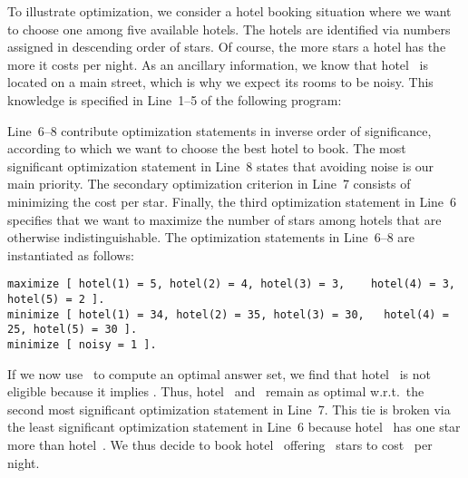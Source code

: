 \begin{example}\label{ex:opt}
To illustrate optimization, we consider a hotel booking situation
where we want to choose one among five available hotels.
The hotels are identified via numbers assigned in descending order of stars.
Of course, the more stars a hotel has the more it costs per night.
As an ancillary information, we know that hotel~ is located
on a main street, which is why we expect its rooms to be noisy.
This knowledge is specified in Line~1--5 of the following program:
%

%
Line~6--8 contribute optimization statements in inverse order of significance,
according to which we want to choose the best hotel to book.
The most significant optimization statement in Line~8 states that
avoiding noise is our main priority.
The secondary optimization criterion in Line~7 consists of
minimizing the cost per star.
Finally, the third optimization statement in Line~6 specifies that we want
to maximize the number of stars among hotels that are otherwise indistinguishable.
The optimization statements in Line~6--8 are instantiated as follows:%
%
\begin{lstlisting}[firstnumber=6,breaklines,breakindent=48pt]
maximize [ hotel(1) = 5, hotel(2) = 4, hotel(3) = 3,    hotel(4) = 3, hotel(5) = 2 ].
minimize [ hotel(1) = 34, hotel(2) = 35, hotel(3) = 30,   hotel(4) = 25, hotel(5) = 30 ].
minimize [ noisy = 1 ].
\end{lstlisting}
If we now use \clasp\ to compute an optimal answer set,%
we find that hotel~ is not eligible because it implies .
Thus, hotel~ and~ remain as optimal w.r.t.\ the second most
significant optimization statement in Line~7.
This tie is broken via the least significant optimization statement in Line~6
because hotel~ has one star more than hotel~.
We thus decide to book hotel~ offering~ stars
to cost~ per night.
\eexample
\end{example}

